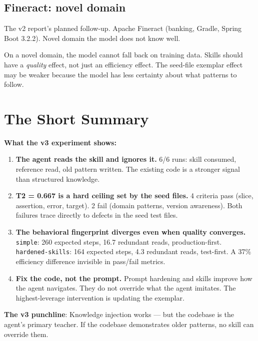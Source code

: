 \documentclass[11pt,a4paper]{article}
\begin{document}
\subsection*{Fineract: novel domain}

The v2 report's planned follow-up. Apache Fineract (banking, Gradle, Spring Boot 3.2.2).
Novel domain the model does not know well.

On a novel domain, the model cannot fall back on training data.
Skills should have a \emph{quality} effect, not just an efficiency effect.
The seed-file exemplar effect may be weaker because the model
has less certainty about what patterns to follow.

\section{The Short Summary}

\begin{keybox}
\textbf{What the v3 experiment shows:}

\begin{enumerate}[leftmargin=1.5em,itemsep=4pt]
  \item \textbf{The agent reads the skill and ignores it.}
    6/6 runs: skill consumed, reference read, old pattern written.
    The existing code is a stronger signal than structured knowledge.

  \item \textbf{T2 = 0.667 is a hard ceiling set by the seed files.}
    4 criteria pass (slice, assertion, error, target). 2 fail
    (domain patterns, version awareness). Both failures trace directly
    to defects in the seed test files.

  \item \textbf{The behavioral fingerprint diverges even when quality converges.}
    \texttt{simple}: 260 expected steps, 16.7 redundant reads, production-first.
    \texttt{hardened-skills}: 164 expected steps, 4.3 redundant reads, test-first.
    A 37\% efficiency difference invisible in pass/fail metrics.

  \item \textbf{Fix the code, not the prompt.}
    Prompt hardening and skills improve how the agent navigates.
    They do not override what the agent imitates.
    The highest-leverage intervention is updating the exemplar.
\end{enumerate}

\vspace{6pt}
\textbf{The v3 punchline}: Knowledge injection works --- but the codebase
is the agent's primary teacher. If the codebase demonstrates older patterns,
no skill can override them.
\end{keybox}
\end{document}
